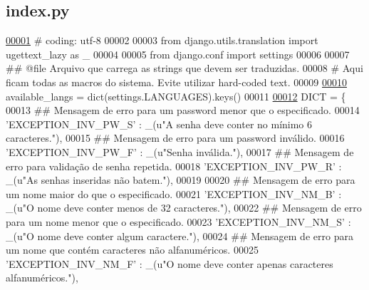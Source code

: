 \hypertarget{locale_2index_8py_source}{}\subsection{index.\+py}
\label{locale_2index_8py_source}

\begin{DoxyCode}
\hypertarget{locale_2index_8py_source_l00001}{}\hyperlink{namespaceELO_1_1locale_1_1index}{00001} \textcolor{comment}{# coding: utf-8}
00002 
00003 \textcolor{keyword}{from} django.utils.translation \textcolor{keyword}{import} ugettext\_lazy \textcolor{keyword}{as} \_
00004 
00005 \textcolor{keyword}{from} django.conf \textcolor{keyword}{import} settings
00006 
00007 \textcolor{comment}{## @file Arquivo que carrega as strings que devem ser traduzidas.}
00008 \textcolor{comment}{#   Aqui ficam todas as macros do sistema. Evite utilizar hard-coded text.}
00009 
\hypertarget{locale_2index_8py_source_l00010}{}\hyperlink{namespaceELO_1_1locale_1_1index_ab62adb4738ab68b1693adb90951d92a9}{00010} available\_langs = dict(settings.LANGUAGES).keys()
00011 
\hypertarget{locale_2index_8py_source_l00012}{}\hyperlink{namespaceELO_1_1locale_1_1index_a065d26641ba89f86fe642e3858607087}{00012} DICT = \{
00013     \textcolor{comment}{## Mensagem de erro para um password menor que o especificado.}
00014     \textcolor{stringliteral}{'EXCEPTION\_INV\_PW\_S'} : \_(\textcolor{stringliteral}{u"A senha deve conter no mínimo 6 caracteres."}),
00015     \textcolor{comment}{## Mensagem de erro para um password inválido.}
00016     \textcolor{stringliteral}{'EXCEPTION\_INV\_PW\_F'} : \_(\textcolor{stringliteral}{u"Senha inválida."}),
00017     \textcolor{comment}{## Mensagem de erro para validação de senha repetida.}
00018     \textcolor{stringliteral}{'EXCEPTION\_INV\_PW\_R'} : \_(\textcolor{stringliteral}{u"As senhas inseridas não batem."}),
00019 
00020     \textcolor{comment}{## Mensagem de erro para um nome maior do que o especificado.}
00021     \textcolor{stringliteral}{'EXCEPTION\_INV\_NM\_B'} : \_(\textcolor{stringliteral}{u"O nome deve conter menos de 32 caracteres."}),
00022     \textcolor{comment}{## Mensagem de erro para um nome menor que o especificado.}
00023     \textcolor{stringliteral}{'EXCEPTION\_INV\_NM\_S'} : \_(\textcolor{stringliteral}{u"O nome deve conter algum caractere."}),
00024     \textcolor{comment}{## Mensagem de erro para um nome que contém caracteres não alfanuméricos.}
00025     \textcolor{stringliteral}{'EXCEPTION\_INV\_NM\_F'} : \_(\textcolor{stringliteral}{u"O nome deve conter apenas caracteres alfanuméricos."}),

\end{DoxyCode}

